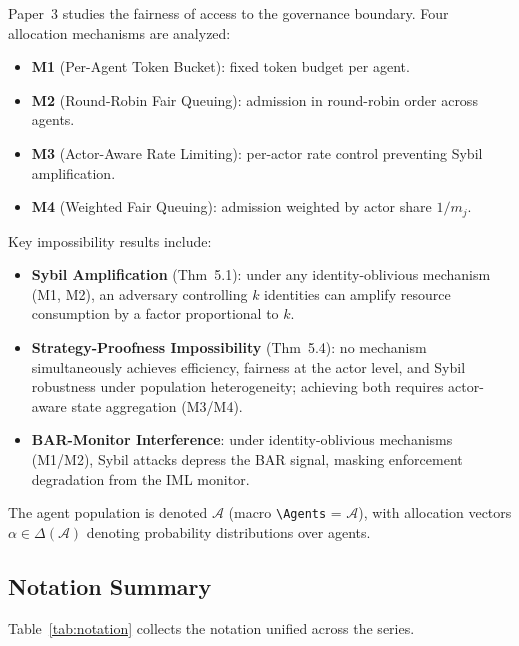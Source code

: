 \documentclass[11pt]{article}
\newcommand{\Agents}{\mathcal{A}}
\begin{document}
Paper~3 studies the fairness of access to the governance boundary. Four
allocation mechanisms are analyzed:
\begin{itemize}[noitemsep]
  \item \textbf{M1} (Per-Agent Token Bucket): fixed token budget per agent.
  \item \textbf{M2} (Round-Robin Fair Queuing): admission in round-robin order across agents.
  \item \textbf{M3} (Actor-Aware Rate Limiting): per-actor rate control preventing Sybil amplification.
  \item \textbf{M4} (Weighted Fair Queuing): admission weighted by actor share $1/m_j$.
\end{itemize}
Key impossibility results include:
\begin{itemize}[noitemsep]
  \item \textbf{Sybil Amplification} (Thm~5.1): under any identity-oblivious
    mechanism (M1, M2), an adversary controlling $k$ identities can amplify resource
    consumption by a factor proportional to $k$.
  \item \textbf{Strategy-Proofness Impossibility} (Thm~5.4): no mechanism
    simultaneously achieves efficiency, fairness at the actor level, and
    Sybil robustness under population heterogeneity; achieving both requires
    actor-aware state aggregation (M3/M4).
  \item \textbf{BAR-Monitor Interference}: under identity-oblivious mechanisms
    (M1/M2), Sybil attacks depress the BAR signal, masking enforcement
    degradation from the IML monitor.
\end{itemize}
The agent population is denoted $\Agents$ (macro \verb|\Agents| = $\mathcal{A}$),
with allocation vectors $\alpha \in \Delta(\Agents)$ denoting probability
distributions over agents.

\subsection{Notation Summary}

Table~\ref{tab:notation} collects the notation unified across the series.
\end{document}
